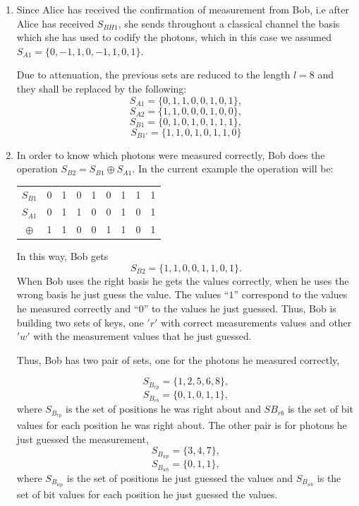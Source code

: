 \begin{enumerate}
  \item Since Alice has received the confirmation of measurement from Bob, i.e after Alice has received $S_{BH1}$, she sends throughout a classical channel the basis which she has used to codify the photons, which in this case we assumed $S_{A1} = \{0,-1,1,0,-1,1,0,1\}$.

      Due to attenuation, the previous sets are reduced to the length $l=8$ and they shall be replaced by the following:
      $$S_{A1}=\{0,1,1,0,0,1,0,1 \},$$
      $$S_{A2}=\{1,1,0,0,0,1,0,0 \},$$
      $$S_{B1}=\{0,1,0,1,0,1,1,1 \},$$
      $$S_{B1'}=\{1,1,0,1,0,1,1,0 \}$$

  \item In order to know which photons were measured correctly, Bob does the operation $S_{B2}=S_{B1} \oplus S_{A1}$.
      In the current example the operation will be:

  \begin{table}[H]
    \centering
    \begin{tabular}{c|c c c c c c c c}
     $S_{B1}$ & 0 & 1 & 0 & 1 & 0 & 1 & 1 & 1 \\
     $S_{A1}$ & 0 & 1 & 1 & 0 & 0 & 1 & 0 & 1 \\ \hline
     $\oplus$ & 1 & 1 & 0 & 0 & 1 & 1 & 0 & 1
    \end{tabular}
    \end{table}

      In this way, Bob gets $$S_{B2} = \{1,1,0,0,1,1,0,1 \}.$$ When Bob uses the right basis he gets the values correctly, when he uses the wrong basis he just guess the value. The values ``$1$'' correspond to the values he measured correctly and ``$0$'' to the values he just guessed.
      Thus, Bob is building two sets of keys, one $'r'$ with correct measurements values and other $'w'$ with the measurement values that he just guessed.

      Thus, Bob has two pair of sets, one for the photons he measured correctly,

      $$S_{B_{rp}}= \{1,2,5,6,8 \},$$ $$ S_{B_{rb}} = \{0,1,0,1,1 \},$$
      where $S_{B_{rp}}$ is the set of positions he was right about and $SB_{rb}$ is the set of bit values for each position he was right about. The other pair is for photons he just guessed the measurement,
      $$S_{B_{wp}}= \{3,4,7 \},$$ $$S_{B_{wb}} = \{0,1,1 \},$$
      where $S_{B_{wp}}$ is the set of positions he just guessed the values and $S_{B_{wb}}$ is the set of bit values for each position he just guessed the values.


\end{enumerate}
